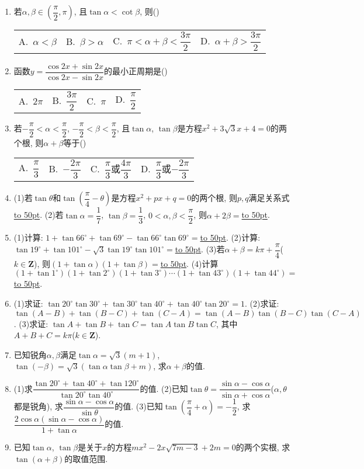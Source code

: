 \documentclass[10pt,a4paper]{article}
\newcommand{\blank}[1]{\underline{\hbox to #1pt{}}}
\newcommand{\fourch}[4]{\par\begin{tabular}{p{.23\textwidth}p{.23\textwidth}p{.23\textwidth}p{.23\textwidth}}
A.~#1 &B.~#2& C.~#3& D.~#4
\end{tabular}}
\begin{document}
\begin{enumerate}[1.]
(5)若$\tan (\alpha +\dfrac{\pi }4)=-\dfrac 9{40}$, 则$\tan \alpha =$\blank{50}, $\tan (\alpha -\dfrac{\pi }4)=$\blank{50}.
\item 若$\alpha ,\beta \in (\dfrac{\pi }2,\pi)$, 且$\tan \alpha <\cot \beta$, 则()
\fourch{$\alpha <\beta$}{$\beta >\alpha$}{$\pi <\alpha +\beta <\dfrac{3\pi }2$}{$\alpha +\beta >\dfrac{3\pi }2$}
\item 函数$y=\dfrac{\cos 2x+\sin 2x}{\cos 2x-\sin 2x}$的最小正周期是()
\fourch{$2\pi$}{$\dfrac{3\pi }2$}{$\pi$}{$\dfrac{\pi }2$}
\item 若$-\dfrac{\pi }2<\alpha <\dfrac{\pi }2$, $-\dfrac{\pi }2<\beta <\dfrac{\pi }2$, 且$\tan \alpha$, $\tan \beta$是方程$x^2+3\sqrt 3x+4=0$的两个根, 则$\alpha +\beta$等于()
\fourch{$\dfrac{\pi }3$}{$-\dfrac{2\pi }3$}{$\dfrac{\pi }3$或$\dfrac{4\pi }3$}{$\dfrac{\pi }3$或$-\dfrac{2\pi }3$}
\item (1)若$\tan \theta$和$\tan (\dfrac{\pi }4-\theta)$是方程$x^2+px+q=0$的两个根, 则$p,q$满足关系式\blank{50}.
(2)若$\tan \alpha =\dfrac 17$, $\tan \beta =\dfrac 13$, $0<\alpha ,\beta <\dfrac{\pi }2$, 则$\alpha +2\beta =$\blank{50}.
\item (1)计算: $1+\tan 66^\circ +\tan 69^\circ -\tan 66^\circ \tan 69^\circ =$\blank{50}.
(2)计算: $\tan 19^\circ +\tan 101^\circ -\sqrt 3\tan 19^\circ \tan 101^\circ =$\blank{50}.
(3)若$\alpha +\beta =k\pi +\dfrac{\pi }4$($k\in \mathbf{Z}$), 则$(1+\tan \alpha)(1+\tan \beta)=$\blank{50}.
(4)计算$(1+\tan 1^\circ)(1+\tan 2^\circ)(1+\tan 3^\circ)\cdots (1+\tan 43^\circ)(1+\tan 44^\circ)=$\blank{50}.
\item (1)求证: $\tan 20^\circ \tan 30^\circ +\tan 30^\circ \tan 40^\circ +\tan 40^\circ \tan 20^\circ =1$.
(2)求证: $\tan (A-B)+\tan (B-C)+\tan (C-A)=\tan (A-B)\tan (B-C)\tan (C-A)$.
(3)求证: $\tan A+\tan B+\tan C=\tan A\tan B\tan C$, 其中$A+B+C=k\pi$($k\in \mathbf{Z}$).
\item 已知锐角$\alpha ,\beta$满足$\tan \alpha =\sqrt 3(m+1)$, $\tan (-\beta)=\sqrt 3(\tan \alpha \tan \beta +m)$, 求$\alpha +\beta$的值.
\item (1)求$\dfrac{\tan 20^\circ +\tan 40^\circ +\tan 120^\circ }{\tan 20^\circ \tan 40^\circ }$的值.
(2)已知$\tan \theta =\dfrac{\sin \alpha -\cos \alpha }{\sin \alpha +\cos \alpha }$($\alpha ,\theta$都是锐角), 求$\dfrac{\sin \alpha -\cos \alpha }{\sin \theta }$的值.
(3)已知$\tan (\dfrac{\pi }4+\alpha)=-\dfrac 12$, 求$\dfrac{2\cos \alpha (\sin \alpha -\cos \alpha)}{1+\tan \alpha }$的值.
\item 已知$\tan \alpha$, $\tan \beta$是关于$x$的方程$mx^2-2x\sqrt {7m-3}+2m=0$的两个实根, 求$\tan (\alpha +\beta)$的取值范围.

\end{enumerate}
\end{document}
